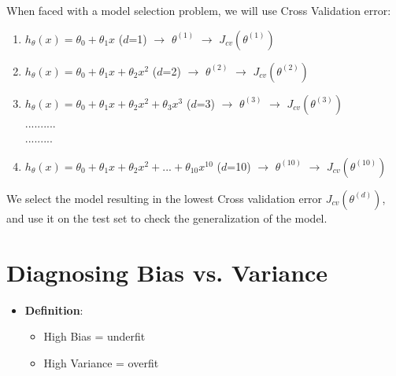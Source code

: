 \documentclass[a4paper,12pt]{report}
\begin{document}
When faced with a model selection problem, we will use Cross Validation error:
\begin{enumerate}
\item $h_{\theta}(x) = \theta_0 + \theta_1 x$  ($d$=1) $\rightarrow$ $\theta^{(1)}$  $\rightarrow$ $J_{cv}(\theta^{(1)})$
\item $h_{\theta}(x) = \theta_0 + \theta_1 x + \theta_2 x^2$  ($d$=2) $\rightarrow$ $\theta^{(2)}$  $\rightarrow$ $J_{cv}(\theta^{(2)})$
\item $h_{\theta}(x) = \theta_0 + \theta_1 x + \theta_2 x^2 + \theta_3 x^3$  ($d$=3) $\rightarrow$ $\theta^{(3)}$  $\rightarrow$ $J_{cv}(\theta^{(3)})$\\ 
.......... \\
.........
\item $h_{\theta}(x) = \theta_0 + \theta_1 x + \theta_2 x^2 + ... +  \theta_{10} x^{10}$  ($d$=10) $\rightarrow$ $\theta^{(10)}$  $\rightarrow$  $J_{cv}(\theta^{(10)})$
\end{enumerate}
We select the model resulting in the lowest Cross validation error $J_{cv}(\theta^{(d)})$, and use it on the test set to check the generalization of the model.


\section{Diagnosing Bias vs. Variance}
\begin{itemize}
\item \textbf{Definition}:
\begin{itemize}
\item High Bias = underfit
\item High Variance = overfit
\end{itemize}
\end{itemize}
\end{document}
